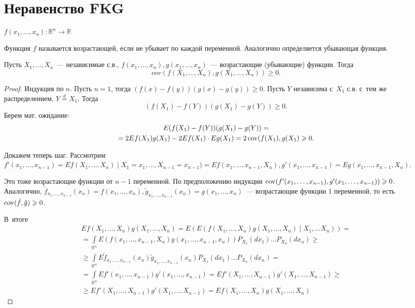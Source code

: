 \documentclass{article}
\begin{document}
\section{Неравенство FKG}

$f(x_1, \ldots, x_n): \mathbb{R}^n \rightarrow \mathbb{R}$

\begin{definition}
	Функция $f$ называется возрастающей, если не убывает по каждой переменной. Аналогично определяется
	убывающая функция.
\end{definition}

\begin{theorem}
	Пусть $X_1, \ldots, X_n$~--- независимые с.в., $f(x_1, \ldots, x_n), g(x_1, \ldots, x_n)$~---
	возрастающие (убывающие) функции. Тогда
	$$cov(f(X_1, \ldots, X_n), g(X_1, \ldots, X_n)) \ge 0.$$
\end{theorem}
\begin{proof}
	Индукция по $n$. Пусть $n = 1$, тогда $(f(x) - f(y))(g(x) - g(y)) \ge 0$. Пусть $Y$ независима
	с~$X_1$ с.в. с~тем же распределением, $Y \overset{d}= X_1$. Тогда
	$$ (f(X_1) - f(Y))(g(X_1) - g(Y)) \ge 0.$$
	Берем мат. ожидание:
	\begin{multline*}
		E(f(X_1) - f(Y))(g(X_1) - g(Y)) =\\
		= 2Ef(X_1)g(X_1) - 2Ef(X_1) \cdot Eg(X_1) = 2\operatorname{cov}(f(X_1), g(X_1) \geqslant 0.
	\end{multline*}

	Докажем теперь шаг. Рассмотрим $f'(x_1, \ldots, x_{n-1}) = Ef(X_1, \ldots, X_n) \mid X_1 = x_1,
	\ldots, X_{n-1} = x_{n-1}) = Ef(x_1, \ldots, x_{n-1},X_n), g'(x_1, \ldots, x_{n-1}) = Eg(x_1,
	\ldots, x_{n-1}, X_n)$.

	Это тоже возрастающие функции от $n - 1$ переменной. По предположению индукции $\operatorname{cov}(f'(x_1,
	\ldots, x_{n-1}), g'(x_1, \ldots, x_{n-1})) \geqslant 0$. Аналогично, $\tilde{f}_{x_1, \ldots,
	x_{n-1}}(x_n) = f(x_1, \ldots, x_n), \tilde{g}_{x_1, \ldots, x_{n-1}}(x_n) = g(x_1, \ldots,
	x_n)$~--- возрастающие функции 1 переменной, то есть $\operatorname{cov}(\tilde{f}, \tilde{g}) \geqslant 0$.

	В~итоге
	\begin{multline*}
		Ef(X_1, \ldots, X_n)g(X_1, \ldots, X_n) = E(E(f(X_1, \ldots, X_n)g(X_1, \ldots, X_n) \mid X_1,
		\ldots X_n)) =\\
		= \int\limits_{\mathbb{R}^n} E(f(x_1, \ldots, x_{n-1},X_n) g(x_1, \ldots, x_{n-1},x_n))
		P_{X_1}(dx_1) \ldots P_{X_n}(dx_n) \ge\\
		\ge \int\limits_{\mathbb{R}^n} E\tilde{f}_{x_1, \ldots, x_{n-1}}(x_n) \tilde{g}_{x_1, \ldots,
		x_{n-1}}(x_n) P_{X_1}(dx_1) \ldots P_{X_n}(dx_n) =\\
		= \int\limits_{\mathbb{R}^n} Ef'(x_1, \ldots, x_{n-1}) g'(x_1, \ldots, x_{n-1}) = Ef'(X_1,
		\ldots, X_{n-1}) g'(X_1, \ldots, X_{n-1}) \ge\\
		\ge Ef'(X_1, \ldots, X_{n-1}) g'(X_1, \ldots, X_{n-1}) = Ef(X_1, \ldots, X_n)g(X_1, \ldots,
		X_n)
	\end{multline*}
\end{proof}
\end{document}
